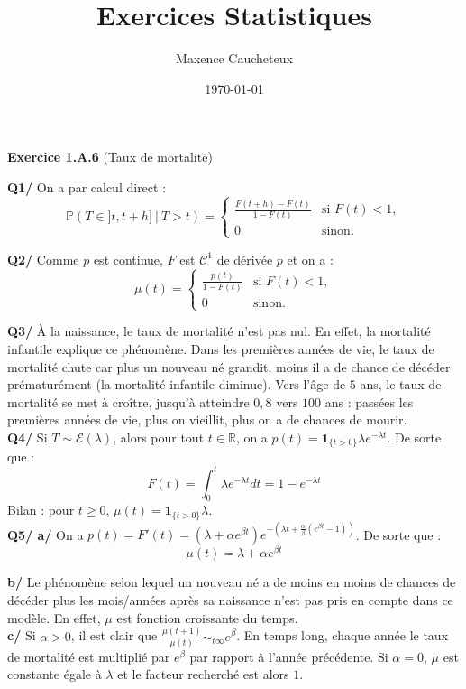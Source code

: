 \documentclass[a4paper,12pt]{article}
\title{Exercices Statistiques}
\author{Maxence Caucheteux}
\date{\today}
\newcommand{\prob}{\mathbb{P}}
\begin{document}
\maketitle

\textbf{Exercice 1.A.6} (Taux de mortalité)

\textbf{Q1/}
On a par calcul direct :
$$\boxed{
\prob(T \in ]t,t+h] \ | \ T>t) =
\left\{
    \begin{array}{ll}
    \frac{F(t+h) - F(t)}{1 - F(t)} & \text{si } F(t) < 1, \\
    0 & \text{sinon}.
    \end{array}
\right.}
$$

\textbf{Q2/}
Comme $p$ est continue, $F$ est $\mathcal{C}^1$ de dérivée $p$ et on a :
$$\boxed{
\mu(t) =
\left\{
    \begin{array}{ll}
    \frac{p(t)}{1 - F(t)} & \text{si } F(t) < 1, \\
    0 & \text{sinon}.
    \end{array}
\right.}
$$


\textbf{Q3/} À la naissance, le taux de mortalité n'est pas nul. En effet, la mortalité infantile explique ce phénomène. Dans les premières années de vie, le taux de mortalité chute car plus un nouveau né grandit, moins il a de chance de décéder prématurément (la mortalité infantile diminue). Vers l'âge de $5$ ans, le taux de mortalité se met à croître, jusqu'à atteindre $0,8$ vers $100$ ans : passées les premières années de vie, plus on vieillit, plus on a de chances de mourir. \\

\textbf{Q4/} Si $T \sim \mathcal{E} (\lambda)$, alors pour tout $t \in \mathbb{R}$, on a $p(t)=\mathbf{1}_{ \{ t>0 \} }\lambda e^{-\lambda t}$. De sorte que :
$$F(t)=\int_{0}^t \lambda e^{-\lambda t} dt = 1-e^{-\lambda t}$$
Bilan : pour $t \geq 0$, $\boxed{\mu(t)=\mathbf{1}_{\{t > 0\} } \lambda}$. \\

\textbf{Q5/ a/} On a $p(t)=F'(t)=(\lambda + \alpha e^{\beta t})e^{-(\lambda t + \frac{\alpha}{\beta}(e^{\beta t} - 1))}$. De sorte que :
$$\boxed{\mu(t)=\lambda + \alpha e^{\beta t}}$$

\textbf{b/} Le phénomène selon lequel un nouveau né a de moins en moins de chances de décéder plus les mois/années après sa naissance n'est pas pris en compte dans ce modèle. En effet, $\mu$ est fonction croissante du temps. \\

\textbf{c/} Si $\alpha > 0$, il est clair que $\frac{\mu(t+1)}{\mu(t)} \sim_{t \infty} e^{\beta}$. En temps long, chaque année le taux de mortalité est multiplié par $\boxed{e^{\beta}}$ par rapport à l'année précédente. Si $\alpha = 0$, $\mu$ est constante égale à $\lambda$ et le facteur recherché est alors $1$. \\
\end{document}
